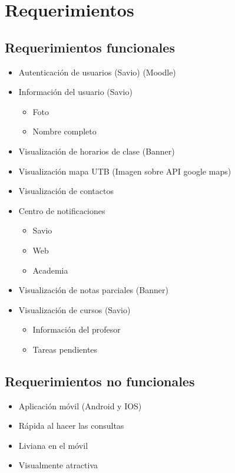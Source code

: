 \chapter{Requerimientos}

\section{Requerimientos funcionales}

\begin{itemize}
 \item Autenticación de usuarios (Savio) (Moodle)
 \item Información del usuario (Savio)
  \begin{itemize}
         \item Foto
         \item Nombre completo
    \end{itemize}
 \item Visualización de horarios de clase (Banner)
 \item Visualización mapa UTB (Imagen sobre API google maps)
 \item Visualización de contactos
 \item Centro de notificaciones
     \begin{itemize}
         \item Savio
         \item Web
         \item Academia
    \end{itemize}
 \item Visualización de notas parciales (Banner)
 \item Visualización de cursos (Savio)
    \begin{itemize}
         \item Información del profesor
         \item Tareas pendientes
    \end{itemize}
\end{itemize}

\section{Requerimientos no funcionales}
 \begin{itemize}
         \item Aplicación móvil (Android y IOS)
         \item Rápida al hacer las consultas
         \item Liviana en el móvil 
         \item Visualmente atractiva
\end{itemize}

